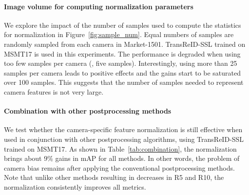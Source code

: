 \paragraph{Image volume for computing normalization parameters}
We explore the impact of the number of samples used to compute the statistics for normalization in Figure~\ref{fig:sample_num}.
Equal numbers of samples are randomly sampled from each camera in Market-1501. TransReID-SSL trained on MSMT17 is used in this experiments.
The performance is degraded when using too few samples per camera (\eg, five samples).
Interestingly, using more than 25 samples per camera leads to positive effects and the gains start to be saturated over 100 samples.
This suggests that the number of samples needed to represent camera features is not very large.


\paragraph{Combination with other postprocessing methods}
We test whether the camera-specific feature normalization is still effective when used in conjunction with other postprocessing algorithms, using TransReID-SSL trained on MSMT17.
As shown in Table~\ref{tab:combination}, the normalization brings about 9\% gains in mAP for all methods.
In other words, the problem of camera bias remains after applying the conventional postprocessing methods.
Note that unlike other methods resulting in decreases in R5 and R10, the normalization consistently improves all metrics.


